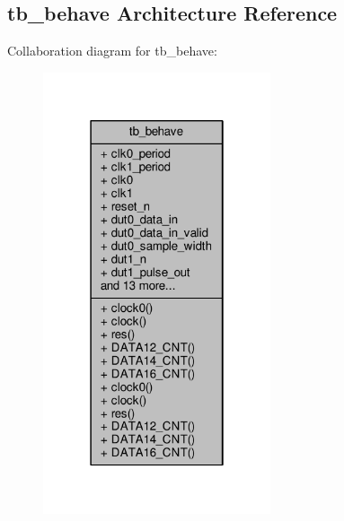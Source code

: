 \subsection{tb\+\_\+behave Architecture Reference}
\label{classbit__pack__tb_1_1tb__behave}


Collaboration diagram for tb\+\_\+behave\+:\nopagebreak
\begin{figure}[H]
\begin{center}
\leavevmode
\includegraphics[width=190pt]{d1/d08/classbit__pack__tb_1_1tb__behave__coll__graph}
\end{center}
\end{figure}
